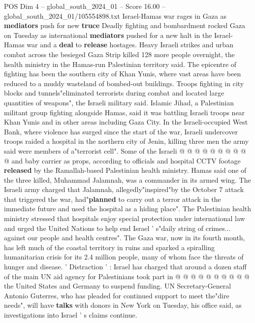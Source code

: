 \begin{textsample}{POS Dim 4 – global\_south\_2024\_01 – Score 16.00 – global\_south\_2024\_01/105554898.txt}  \label{ex:f4_pos_372}
Israel-Hamas war rages in Gaza as \textbf{mediators} push for new \textbf{truce} Deadly fighting and bombardment rocked Gaza on Tuesday as international \textbf{mediators} pushed for a new halt in the Israel-Hamas war and a \textbf{deal} to \textbf{release} hostages.
Heavy Israeli strikes and urban combat across the besieged Gaza Strip killed 128 more people overnight, the health ministry in the Hamas-run Palestinian territory said.
The epicentre of fighting has been the southern city of Khan Yunis, where vast areas have been reduced to a muddy wasteland of bombed-out buildings.
Troops fighting in city blocks and tunnels"eliminated terrorists during combat and located large quantities of weapons", the Israeli military said.
Islamic Jihad, a Palestinian militant group fighting alongside Hamas, said it was battling Israeli troops near Khan Yunis and in other areas including Gaza City.
In the Israeli-occupied West Bank, where violence has surged since the start of the war, Israeli undercover troops raided a hospital in the northern city of Jenin, killing three men the army said were members of a"terrorist cell".
Some of the Israeli @ @ @ @ @ @ @ @ @ @ and baby carrier as props, according to officials and hospital CCTV footage \textbf{released} by the Ramallah-based Palestinian health ministry.
Hamas said one of the three killed, Muhammad Jalamnah, was a commander in its armed wing.
The Israeli army charged that Jalamnah, allegedly"inspired"by the October 7 attack that triggered the war, had"\textbf{planned} to carry out a terror attack in the immediate future and used the hospital as a hiding place".
The Palestinian health ministry stressed that hospitals enjoy special protection under international law and urged the United Nations to help end Israel ' s"daily string of crimes... against our people and health centres".
The Gaza war, now in its fourth month, has left much of the coastal territory in ruins and sparked a spiralling humanitarian crisis for its 2.4 million people, many of whom face the threats of hunger and disease. ' Distraction ' : Israel has charged that around a dozen staff of the main UN aid agency for Palestinians took part in @ @ @ @ @ @ @ @ @ @ the United States and Germany to suspend funding.
UN Secretary-General Antonio Guterres, who has pleaded for continued support to meet the"dire needs", will have \textbf{talks} with donors in New York on Tuesday, his office said, as investigations into Israel ' s claims continue.

\end{textsample}
